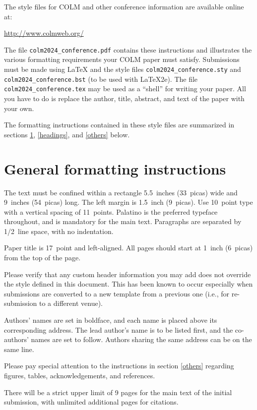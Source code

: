 \documentclass{article} %
\begin{document}
The style files for COLM and other conference information are available online at:
\begin{center}
   \url{http://www.colmweb.org/}
\end{center}
The file \verb+colm2024_conference.pdf+ contains these
instructions and illustrates the
various formatting requirements your COLM paper must satisfy.
Submissions must be made using \LaTeX{} and the style files
\verb+colm2024_conference.sty+ and \verb+colm2024_conference.bst+ (to be used with \LaTeX{}2e). The file
\verb+colm2024_conference.tex+ may be used as a ``shell'' for writing your paper. All you
have to do is replace the author, title, abstract, and text of the paper with
your own.

The formatting instructions contained in these style files are summarized in
sections \ref{gen_inst}, \ref{headings}, and \ref{others} below.

\section{General formatting instructions}
\label{gen_inst}

The text must be confined within a rectangle 5.5~inches (33~picas) wide and
9~inches (54~picas) long. The left margin is 1.5~inch (9~picas).
Use 10~point type with a vertical spacing of 11~points. Palatino is the
preferred typeface throughout, and is mandatory for the main text. Paragraphs are separated by 1/2~line space, with no indentation. 

Paper title is 17~point and left-aligned.
All pages should start at 1~inch (6~picas) from the top of the page.

Please verify that any custom header information you may add does not override the style defined in this document. This has been known to occur especially when submissions are converted to a new template from a previous one (i.e., for re-submission to a different venue). 

Authors' names are
set in boldface, and each name is placed above its corresponding
address. The lead author's name is to be listed first, and
the co-authors' names are set to follow. Authors sharing the
same address can be on the same line.

Please pay special attention to the instructions in section \ref{others}
regarding figures, tables, acknowledgements, and references.


There will be a strict upper limit of 9 pages for the main text of the initial submission, with unlimited additional pages for citations. 
\end{document}
